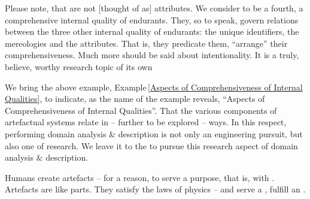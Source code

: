 %

\noindent
\pos{\psno}{\mnewfoil}
\begynd
\pind Please note, that  are not [thought of as] attributes.
\begynd
\pind We consider  to be a fourth, \nyl a comprehensive
      internal quality of endurants.
\pind They, so to speak, govern relations between the three other \nyl
      internal quality of endurants: \nyl the unique identifiers, the
      mereologies and the attributes.
\pind That is, they predicate them, ``arrange'' their comprehensiveness.
\afslut
\pind Much more should be said about intentionality.
\pind It is a truly,  believe, worthy research topic of its own \dbsquare
\afslut

\pos{\psno}{\mnewfoil}
\noindent%
\pos{\psno}{\mnewfoil}%
\begynd%
\pind We bring the above example, \nyl Example\,\vref{Aspects of
      Comprehensiveness of Internal Qualities}, to indicate, \nyl
      as the name of the example reveals, \nyl
      ``Aspects of Comprehensiveness of Internal Qualities''.
\begynd
\pind That the various components of artefactual systems \nyl
      relate in -- further to be explored -- ways.
\pind In this respect, performing domain analysis \& description \nyl
      is not only an engineering pursuit, but also one of research.
\pind We leave it to the  to pursue this
      research aspect \nyl of domain analysis \& description. 
\afslut
\afslut

\label{nl-1}
\begynd
\pind Humans create artefacts -- \nyl for a reason, to serve a
                 purpose, that is, with .
\begynd
\pind Artefacts are like parts.
\pind They satisfy the laws of physics --
\pind and serve a , fulfill an .
\afslut
\afslut

